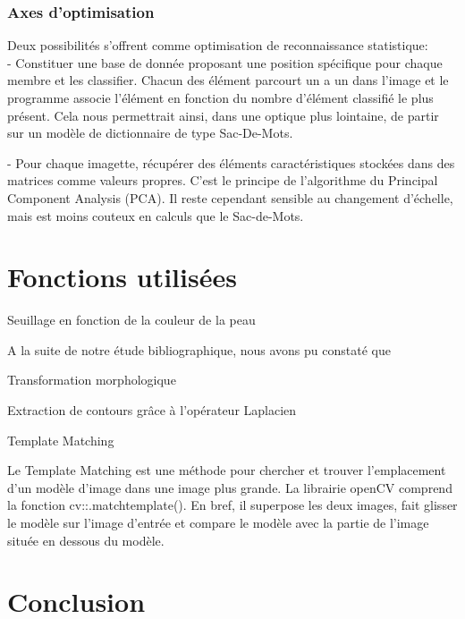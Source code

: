 \documentclass[10pt,a4paper]{report}
\begin{document}
\subsubsection*{Axes d'optimisation}
Deux possibilités s'offrent comme optimisation de reconnaissance statistique:\\

- Constituer une base de donnée proposant une position spécifique pour chaque membre et les classifier. Chacun des élément parcourt un a un dans l'image et le programme associe l'élément en fonction du nombre d'élément classifié le plus présent. Cela nous permettrait ainsi, dans une optique plus lointaine, de partir sur un modèle de dictionnaire de type Sac-De-Mots.

- Pour chaque imagette, récupérer des éléments caractéristiques stockées dans des matrices comme valeurs propres. C'est le principe de l'algorithme du Principal Component Analysis (PCA). Il reste cependant sensible au changement d'échelle, mais est moins couteux en calculs que le Sac-de-Mots.


\section{Fonctions utilisées}

Seuillage en fonction de la couleur de la peau


A la suite de notre étude bibliographique, nous avons pu constaté que 



Transformation morphologique


Extraction de contours grâce à l’opérateur Laplacien



Template Matching

Le Template Matching est une méthode pour chercher et trouver l’emplacement d’un modèle d’image dans une image plus grande. La librairie openCV comprend la fonction cv::.matchtemplate(). En bref, il superpose les deux images, fait glisser le modèle sur l’image d’entrée et compare le modèle avec la partie de l’image située en dessous du modèle.

\section{Conclusion}
\end{document}
